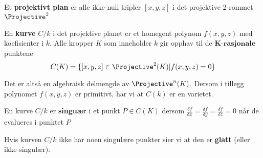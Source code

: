 \begin{definisjon}
Et \textbf{projektivt plan} er alle ikke-null tripler $[x, y, z]$ i det projektive 2-rommet $\Projective^2$
\end{definisjon}

\begin{definisjon}
En \textbf{kurve} $C/k$ i det projektive planet er et homegent polynom $f(x,y,z)$ med koefisienter i $k$. Alle kropper $K$ som inneholder $k$ gir opphav til de $\textbf{K-rasjonale}$ punktene $$C(K) = \{[x, y, z] \in \Projective^2(K) | f(x,y,z) = 0\}$$
\end{definisjon}

Det er altså en algebraisk delmengde av $\Projective^n(K)$. Dersom i tillegg polynomet $f(x,y,z)$ er primitivt, har vi at $C(k)$ er en varietet.

\begin{definisjon}
En kurve $C/k$ er \textbf{singuær} i et punkt $P \in C(K)$ dersom $ \frac{\delta f}{\delta x} = \frac{\delta f}{\delta y} = \frac{\delta f}{\delta z} = 0$ når de evalueres i punktet $P$

Hvis kurven $C/k$ ikke har noen singulære punkter sier vi at den er \textbf{glatt} (eller ikke-singulær).
\end{definisjon}
